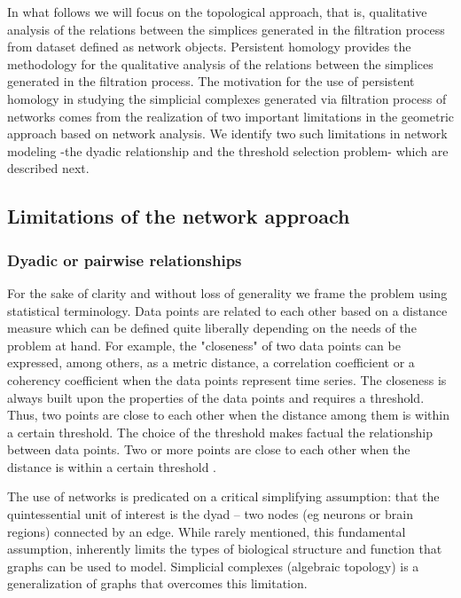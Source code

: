 \documentclass[onecollarge,runningheads]{svjour2}
\begin{document}
In what follows we will focus on the topological approach, that is, qualitative analysis of the relations between the simplices generated in the filtration process from dataset defined as network objects. %
Persistent homology provides the methodology for the qualitative analysis of the relations between the simplices generated in the filtration process. The motivation for the use of persistent homology in studying the simplicial complexes generated via filtration process of networks comes from the realization of two important limitations in the geometric approach based on network analysis. We identify two such limitations in network modeling -the dyadic relationship and the threshold selection problem- which are described next.

\subsection{Limitations of the network approach}
\label{se:limita}

\subsubsection{Dyadic or pairwise relationships}
\label{sse:dy}
For the sake of clarity and without loss of generality we frame the problem using statistical terminology.
Data points are related to each other based on a distance measure which can be defined quite liberally depending on the needs of the problem at hand. For example, the "closeness" of two data points can be expressed, among others, as a metric distance, a correlation coefficient or a coherency coefficient when the data points represent time series.
The closeness is always built upon the properties of the data points and requires a threshold. Thus, two points are close to each other when the distance among them is within a certain threshold. The choice of the threshold makes factual the relationship between data points. Two or more points are close to each other when the distance is within a certain threshold \cite{giusti2016two}.

The use of networks is predicated on a critical simplifying assumption: that the quintessential unit of interest is the dyad – two nodes (eg neurons or brain regions) connected by an edge. While rarely mentioned, this fundamental assumption, inherently limits the types of biological structure and function that graphs can be used to model. Simplicial complexes (algebraic topology) is a generalization of graphs that overcomes this limitation.
\end{document}
